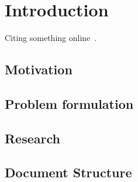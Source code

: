 
%

\chapter{Introduction}
Citing something online~\cite{arxivIltisLearning,arxiv}.


\section{Motivation}

\section{Problem formulation}
\section{Research}
\section{Document Structure}





